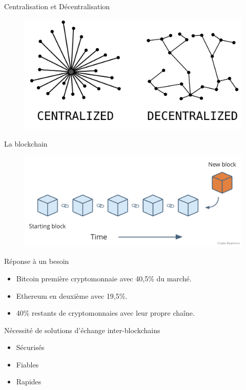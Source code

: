\begin{frame}{Centralisation et Décentralisation}
    \begin{figure}
        \centering
        \includegraphics[scale = 0.2]{introduction/CentralDecentral.png}
    \end{figure}
\end{frame}

\begin{frame}{La blockchain}
    \begin{figure}
        \centering
        \includegraphics[scale = 0.3]{introduction/blockchain.png}
    \end{figure}
\end{frame}


\begin{frame}{Réponse à un besoin}
    \begin{block}{}
        \begin{itemize}
        \item Bitcoin première cryptomonnaie avec 40,5\% du marché.
        \item Ethereum en deuxième avec 19,5\%.
        \item 40\% restants de cryptomonnaies avec leur propre chaîne.
    \end{itemize}
    \end{block}
    \begin{block}{Nécessité de solutions d'échange inter-blockchains}
        \begin{itemize}
            \item Sécurisés
            \item Fiables
            \item Rapides
        \end{itemize}
    \end{block}
    \end{frame}